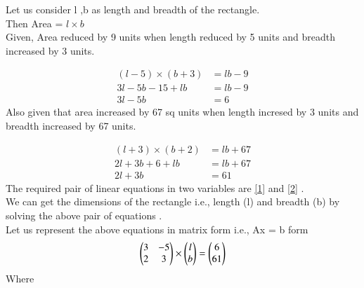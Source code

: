 \documentclass[journal]{IEEEtran}
\begin{document}
Let us consider l ,b as length and breadth of the rectangle. \\
Then Area = $l \times b$ \\
Given, Area reduced by 9 units when length reduced by 5 units and breadth increased by 3 units.
\begin{figure}[!ht]
\centering
{}%
\end{figure}
\begin{align}
(l-5) \times (b+3) &= lb - 9 \\
3l - 5b -15 +lb&=lb-9 \\
3l-5b &=6 \label{1}
\end{align}
Also given that area increased by 67 sq units when length incresed by 3 units and breadth increased by 67 units.
\begin{figure}[!ht]
\centering
{}%
\end{figure}
\begin{align}
(l+3) \times (b+2) &= lb+67 \\
2l+3b +6 +lb&=lb+67 \\
2l +3b  &=61 \label{2}
\end{align}
The required pair of linear equations in two variables are \eqref{1} and \eqref{2} . \\
We can get the dimensions of the rectangle i.e., length (l) and breadth (b) by solving the above pair of equations . \\
Let us represent the above equations in matrix form i.e., Ax = b form \\ 
\begin{align}
\begin{pmatrix}
3 & -5 \\
2 & 3
\end{pmatrix} \times \begin{pmatrix}l \\ b\end{pmatrix} = \begin{pmatrix}6 \\ 61\end{pmatrix}
\end{align}
Where 
\end{document}
